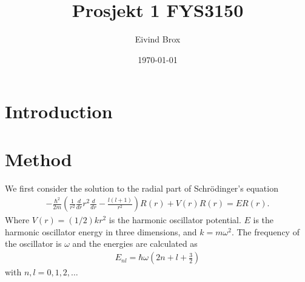 \documentclass[11pt, a4paper]{article}
\author{Eivind Brox}
\title{Prosjekt 1 FYS3150}
\date{\today}
\begin{document}
\maketitle
\thispagestyle{empty}
\clearpage

\pagestyle{headings}
\tableofcontents
\clearpage

\section{Introduction}


\clearpage


\section{Method}
We first consider the solution to the radial part of Schr\"odinger's equation
\begin{gather}
  -\frac{\hbar^2}{2 m} \left ( \frac{1}{r^2} \frac{d}{dr} r^2
  \frac{d}{dr} - \frac{l (l + 1)}{r^2} \right )R(r) + V(r) R(r) = E R(r).
\end{gather}
Where $V(r) = (1/2)kr^2$ is the harmonic oscillator potential. $E$ is the harmonic oscillator energy in three dimensions, and $k=m\omega^2$. The frequency of the oscillator is $\omega$ and the energies are calculated as
\begin{gather}
E_{nl}=  \hbar \omega \left(2n+l+\frac{3}{2}\right)
\end{gather}
with $n,l = 0,1,2,\dots$
\end{document}

